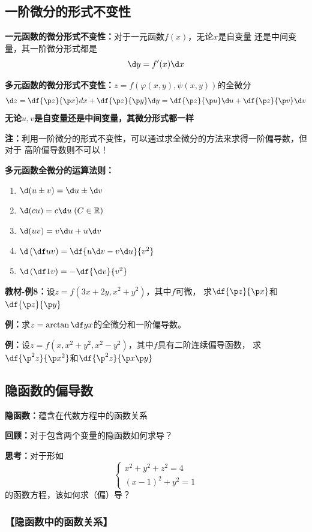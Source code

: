 \subsection{一阶微分的形式不变性}

{\bf 一元函数的微分形式不变性：}对于一元函数$f(x)$，无论$x$是自变量
还是中间变量，其一阶微分形式都是
$$\d y=f'(x)\d x$$

{\bf 多元函数的微分形式不变性：}$z=f(\varphi(x,y),\psi(x,y))$的全微分
$${\d z=\df{\p z}{\p x}dx+\df{\p z}{\p y}\d y
=\df{\p z}{\p u}\d u+\df{\p z}{\p v}\d v}$$
{\bf 无论$u,v$是自变量还是中间变量，其微分形式都一样}

{\bf 注：}利用一阶微分的形式不变性，可以通过求全微分的方法来求得一阶偏导数，但对于
高阶偏导数则不可以！

{\bf 多元函数全微分的运算法则：}
\begin{enumerate}[(1)]
  \setlength{\itemindent}{1cm}
  \item $\d(u\pm v)=\d u\pm \d v$
  \item $\d(cu)=c\d u\;(C\in\mathbb{R})$
  \item $\d(uv)=v\d u+u\d v$
  \item $\d\left(\df uv\right)=\df{u\d v-v\d u}{v^2}$
  \item $\d\left(\df 1v\right)=-\df{\d v}{v^2}$
\end{enumerate}

{\bf 教材-例8：}设$z=f(3x+2y,x^2+y^2)$，其中$f$可微，
求$\df{\p z}{\p x}$和$\df{\p z}{\p y}$

{\bf 例：}求$z=\arctan\df yx$的全微分和一阶偏导数。

{\bf 例：}设$z=f(x,x^2+y^2,x^2-y^2)$，其中$f$具有二阶连续偏导函数，
求$\df{\p^2 z}{\p x^2}$和$\df{\p^2 z}{\p x\p y}$

\subsection{隐函数的偏导数}

{\bf 隐函数：}蕴含在代数方程中的函数关系

{\bf 回顾：}对于包含两个变量的隐函数如何求导？

{\bf 思考：}对于形如
$$\left\{\begin{array}{l}
	  	x^2+y^2+z^2=4\\
	  	(x-1)^2+y^2=1
	  \end{array}\right.$$
的函数方程，该如何求（偏）导？

\subsubsection{【隐函数中的函数关系】}

